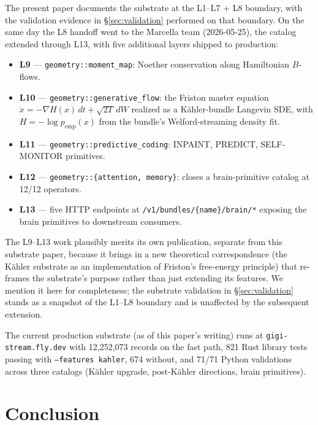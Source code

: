 \documentclass[11pt,letterpaper]{article}
\begin{document}
The present paper documents the substrate at the L1--L7 + L8
boundary, with the validation evidence in
\S\ref{sec:validation} performed on that boundary. On the same day
the L8 handoff went to the Marcella team (2026-05-25), the catalog
extended through L13, with five additional layers shipped to
production:
\begin{itemize}[nosep]
\item \textbf{L9} --- \texttt{geometry::moment\_map}: Noether
  conservation along Hamiltonian $B$-flows.
\item \textbf{L10} --- \texttt{geometry::generative\_flow}: the
  Friston master equation
  $\dot{x} = -\nabla H(x)\, dt + \sqrt{2T}\, dW$ realized as a
  K\"ahler-bundle Langevin SDE, with $H = -\log p_{\text{emp}}(x)$
  from the bundle's Welford-streaming density fit.
\item \textbf{L11} --- \texttt{geometry::predictive\_coding}:
  INPAINT, PREDICT, SELF-MONITOR primitives.
\item \textbf{L12} --- \texttt{geometry::\{attention, memory\}}:
  closes a brain-primitive catalog at 12/12 operators.
\item \textbf{L13} --- five HTTP endpoints at
  \texttt{/v1/bundles/\{name\}/brain/*} exposing the brain
  primitives to downstream consumers.
\end{itemize}

The L9--L13 work plausibly merits its own publication, separate
from this substrate paper, because it brings in a new theoretical
correspondence (the K\"ahler substrate as an implementation of
Friston's free-energy principle) that re-frames the substrate's
purpose rather than just extending its features. We mention it
here for completeness; the substrate validation in
\S\ref{sec:validation} stands as a snapshot of the L1--L8 boundary
and is unaffected by the subsequent extension.

The current production substrate (as of this paper's writing) runs
at \texttt{gigi-stream.fly.dev} with 12{,}252{,}073 records on the
fast path, 821 Rust library tests passing with
\texttt{--features kahler}, 674 without, and 71/71 Python
validations across three catalogs (K\"ahler upgrade, post-K\"ahler
directions, brain primitives).


\section{Conclusion}
\label{sec:conclusion}
\end{document}
